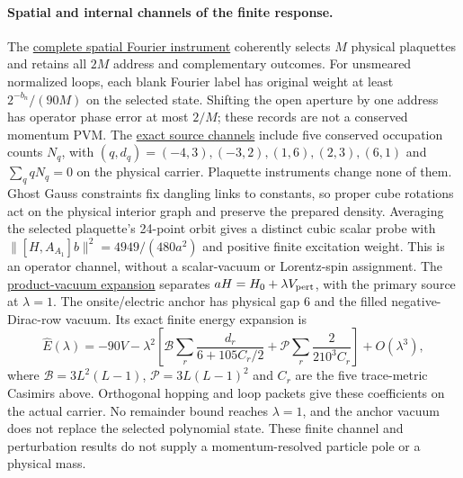 \paragraph{Spatial and internal channels of the finite response.}
The \href{https://github.com/FloatingPragma/observer-patch-holography/blob/main/model/particle_primary_momentum/PROOF.md}{complete spatial Fourier instrument}
coherently selects $M$ physical plaquettes and retains all $2M$ address
and complementary outcomes. For unsmeared normalized loops, each blank
Fourier label has original weight at least $2^{-b_n}/(90M)$ on the
selected state. Shifting the open aperture by one address has operator
phase error at most $2/M$; these records are not a conserved momentum
PVM. The \href{https://github.com/FloatingPragma/observer-patch-holography/blob/main/model/particle_primary_channel_labels/PROOF.md}{exact source channels}
include five conserved occupation counts $N_q$, with
$(q,d_q)=(-4,3),(-3,2),(1,6),(2,3),(6,1)$ and
$\sum_q qN_q=0$ on the physical carrier. Plaquette instruments change
none of them. Ghost Gauss constraints fix dangling links to constants,
so proper cube rotations act on the physical interior graph and preserve
the prepared density. Averaging the selected plaquette's 24-point orbit
gives a distinct cubic scalar probe with
$\|[H,A_{A_1}]b\|^2=4949/(480a^2)$ and positive finite excitation
weight. This is an operator channel, without a scalar-vacuum or Lorentz-spin
assignment. The \href{https://github.com/FloatingPragma/observer-patch-holography/blob/main/model/particle_primary_spectral_scale/PROOF.md}{product-vacuum expansion}
separates $aH=H_0+\lambda V_{\rm pert}$, with the primary source at
$\lambda=1$. The onsite/electric anchor has physical gap $6$ and the filled
negative-Dirac-row vacuum. Its exact finite energy expansion is
\[
 \widehat E(\lambda)=-90V-\lambda^2\left[
  \mathcal B\sum_r\frac{d_r}{6+105C_r/2}
  +\mathcal P\sum_r\frac{2}{210^3C_r}\right]+O(\lambda^3),
\]
where $\mathcal B=3L^2(L-1)$, $\mathcal P=3L(L-1)^2$ and $C_r$
are the five trace-metric Casimirs above. Orthogonal hopping and loop
packets give these coefficients on the actual carrier. No remainder
bound reaches $\lambda=1$, and the anchor vacuum does not replace the
selected polynomial state. These finite channel and perturbation results
do not supply a momentum-resolved particle pole or a physical mass.

